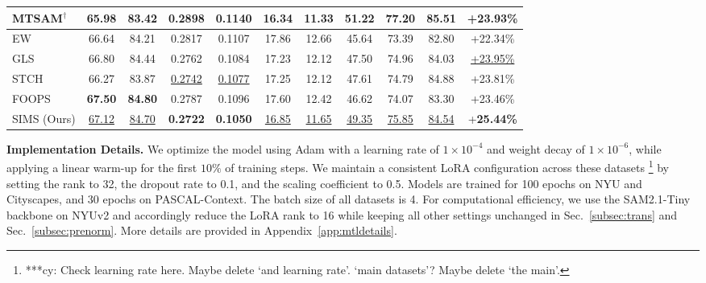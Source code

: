 \documentclass[sigconf]{acmart}
\begin{document}
\begin{table}[!phbt]
\begin{tabular}{lcccccccccc}
MTSAM$^{\dagger}$ & 65.98 & 83.42 & 0.2898 & 0.1140 & \textbf{16.34} & \textbf{11.33} & \textbf{51.22} & \textbf{77.20} & \textbf{85.51} & +23.93\% \\
\midrule
EW    & 66.64 & 84.21 & 0.2817 & 0.1107 & 17.86 & 12.66 & 45.64 & 73.39 & 82.80 & +22.34\% \\
GLS   & 66.80 & 84.44 & 0.2762 & 0.1084 & 17.23 & 12.12 & 47.50 & 74.96 & 84.03 & \underline{+23.95\%} \\
STCH  & 66.27 & 83.87 & \underline{0.2742} & \underline{0.1077} & 17.25 & 12.12 & 47.61 & 74.79 & 84.88 & +23.81\% \\
FOOPS & \textbf{67.50} & \textbf{84.80} & 0.2787 & 0.1096 & 17.60 & 12.42 & 46.62 & 74.07 & 83.30 & +23.46\% \\
SIMS (Ours)  & \underline{67.12} & \underline{84.70} & \textbf{0.2722} & \textbf{0.1050} & \underline{16.85}   & \underline{11.65}   & \underline{49.35} & \underline{75.85} & \underline{84.54} & +\textbf{25.44\%} \\
\bottomrule
\end{tabular}
\vspace{-6pt}
\end{table}

\vspace{0.5\baselineskip}

\noindent \textbf{Implementation Details.}
We optimize the model using Adam with a learning rate of $1\times10^{-4}$ and weight decay of $1\times10^{-6}$, while applying a linear warm-up for the first $10\%$ of training steps. We maintain a consistent LoRA configuration across these datasets \footnote{***cy: Check learning rate here. Maybe delete `and learning rate'. `main datasets'? Maybe delete `the main'. } by setting the rank to 32, the dropout rate to 0.1, and the scaling coefficient to 0.5. Models are trained for 100 epochs on NYU and Cityscapes, and 30 epochs on PASCAL-Context. The batch size of all datasets is 4. For computational efficiency, we use the SAM2.1-Tiny backbone on NYUv2 and accordingly reduce the LoRA rank to 16 while keeping all other settings unchanged in Sec.~\ref{subsec:trans} and Sec.~\ref{subsec:prenorm}. More details are provided in Appendix~\ref{app:mtldetails}.
\end{document}
